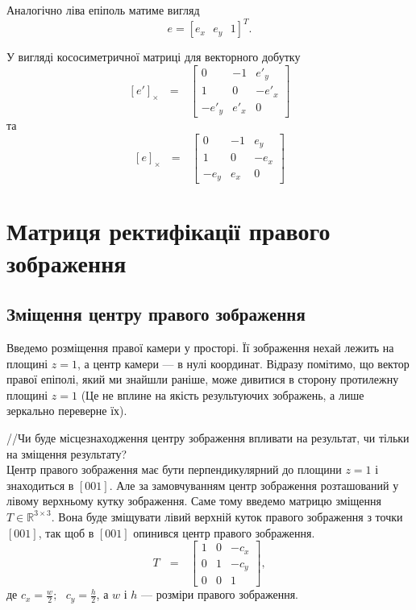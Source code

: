 Аналогічно ліва епіполь матиме вигляд
\begin{equation}
e = {[e_x \:\:\: e_y \:\:\: 1]}^T.
\end{equation}

У вигляді кососиметричної матриці для векторного добутку
\begin{equation}
{[e']}_\times \:\:\: = \:\:\:
\left[
\begin{matrix}
0 & -1 & {e'}_y\\
1 & 0 & -{e'}_x\\
-{e'}_y & {e'}_x & 0\
\end{matrix}
\right]
\end{equation}
та
\begin{equation}
{[e]}_\times \:\:\: = \:\:\:
\left[
\begin{matrix}
0 & -1 & {e}_y\\
1 & 0 & -{e}_x\\
-{e}_y & {e}_x & 0\
\end{matrix}
\right]
\end{equation} 



\section{Матриця ректифікації правого зображення}
\subsection{Зміщення центру правого зображення}
Введемо розміщення правої камери у просторі. Її зображення нехай лежить на
площині $z=1$, а центр камери --- в нулі координат. Відразу помітимо, що вектор
правої епіполі, який ми знайшли раніше, може дивитися в сторону протилежну 
площині $z=1$ (Це не вплине на якість результуючих зображень, а лише зеркально 
переверне їх).

//Чи буде місцезнаходження центру зображення впливати на результат, чи тільки на
зміщення результату?\\
Центр правого зображення має бути перпендикулярний до площини $z=1$ і 
знаходиться в $[0 0 1]$. Але за замовчуванням центр зображення розташований 
у лівому верхньому кутку зображення. Саме тому введемо матрицю зміщення 
$T \in \mathbb{R}^{3\times3}$. Вона буде зміщувати лівий верхній куток 
правого зображення з точки $[0 0 1]$, так щоб в $[0 0 1]$ опинився 
центр правого зображення.
\begin{equation}
T \:\:\: = \:\:\:\left[
\begin{matrix}
1 & 0 & -c_x\\
0 & 1 & -c_y\\
0 & 0 & 1\
\end{matrix}
\right],
\end{equation}
де $c_x = \frac{w}{2}; \:\:\: c_y = \frac{h}{2}$, а $w$ і $h$ --- розміри 
правого зображення.

